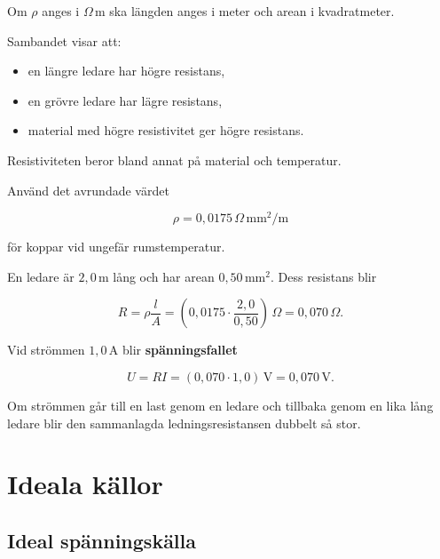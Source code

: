 \documentclass[
  swedish,
  11pt,
  a4paper,
  DIV=11,
  numbers=noendperiod,
  twoside,
  open=any]{scrreprt}
\begin{document}
Om \(\rho\) anges i \(\Omega\,\mathrm{m}\) ska längden anges i meter och
arean i kvadratmeter.

Sambandet visar att:

\begin{itemize}
\item
  en längre ledare har högre resistans,
\item
  en grövre ledare har lägre resistans,
\item
  material med högre resistivitet ger högre resistans.
\end{itemize}

Resistiviteten beror bland annat på material och temperatur.

\begin{tcolorbox}[enhanced jigsaw, arc=.35mm, bottomrule=.15mm, bottomtitle=1mm, breakable, colback=white, colbacktitle=quarto-callout-note-color!10!white, colframe=quarto-callout-note-color-frame, coltitle=black, left=2mm, leftrule=.75mm, opacityback=0, opacitybacktitle=0.6, rightrule=.15mm, title={Exempel: resistans i en kopparledning}, titlerule=0mm, toprule=.15mm, toptitle=1mm]

Använd det avrundade värdet

\[
\rho = 0{,}0175\,\Omega\,\mathrm{mm^2/m}
\]

för koppar vid ungefär rumstemperatur.

En ledare är \(2{,}0\,\mathrm{m}\) lång och har arean
\(0{,}50\,\mathrm{mm^2}\). Dess resistans blir

\[
R = \rho\frac{l}{A}
= \left(0{,}0175 \cdot \frac{2{,}0}{0{,}50}\right)\,\Omega
= 0{,}070\,\Omega.
\]

Vid strömmen \(1{,}0\,\mathrm{A}\) blir \textbf{spänningsfallet}

\[
U = RI
= (0{,}070 \cdot 1{,}0)\,\mathrm{V}
= 0{,}070\,\mathrm{V}.
\]

Om strömmen går till en last genom en ledare och tillbaka genom en lika
lång ledare blir den sammanlagda ledningsresistansen dubbelt så stor.

\end{tcolorbox}

\section{Ideala källor}\label{sec-grunder-ideala-kallor}

\subsection{Ideal
spänningskälla}\label{sec-grunder-ideal-spanningskalla}
\end{document}

